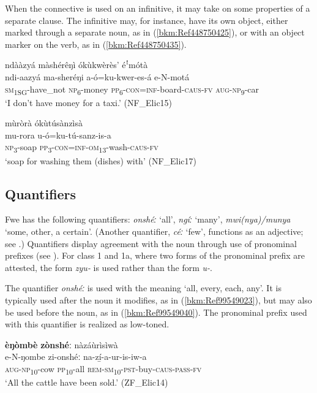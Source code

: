When the connective is used on an infinitive, it may take on some properties of a separate clause. The infinitive may, for instance, have its own object, either marked through a separate noun, as in (\ref{bkm:Ref448750425}), or with an object marker on the verb, as in (\ref{bkm:Ref448750435}).

\ea
\label{bkm:Ref448750425}
ndààzyá màshérêŋì ókùkwèrès’ éꜝmótà\\
\gll ndi-aazyá    ma-sheréŋi a-ó=ku-kwer-es-á      e-N-motá \\
\textsc{sm}\textsubscript{1SG}-have\_not  \textsc{np}\textsubscript{6}-money \textsc{pp}\textsubscript{6}-\textsc{con}=\textsc{inf}-board-\textsc{caus}-\textsc{fv}  \textsc{aug}-\textsc{np}\textsubscript{9}-car\\
\glt ‘I don’t have money for a taxi.’ (NF\_Elic15)
\z

\ea
\label{bkm:Ref448750435}
mùròrà ókùtúsànzìsà\\
\gll mu-rora  u-ó=ku-tú-sanz-is-a\\
\textsc{np}\textsubscript{3}-soap  \textsc{pp}\textsubscript{3}-\textsc{con}=\textsc{inf}-\textsc{om}\textsubscript{13}-wash-\textsc{caus}-\textsc{fv}\\
\glt ‘soap for washing them (dishes) with’ (NF\_Elic17)
\z
\subsection{Quantifiers}\label{bkm:Ref99546522}
\begin{sloppypar}
Fwe has the following quantifiers: \textit{onshéː} ‘all’, \textit{ngíː} ‘many’, \textit{mwi(nya)/munya} ‘some, other, a certain’. (Another quantifier, \textit{céː} ‘few’, functions as an adjective; see .) Quantifiers display agreement with the noun through use of pronominal prefixes (see ). For class 1 and 1a, where two forms of the pronominal prefix are attested, the form \textit{zyu-} is used rather than the form \textit{u-}.
\end{sloppypar}

The quantifier \textit{onshéː} is used with the meaning ‘all, every, each, any’. It is typically used after the noun it modifies, as in (\ref{bkm:Ref99549023}), but may also be used before the noun, as in (\ref{bkm:Ref99549040}). The pronominal prefix used with this quantifier is realized as low-toned.

\ea
\label{bkm:Ref99549023}
\textbf{èŋòmbè} \textbf{zònshéː} nàzáùrìsìwà\\
\gll e-N-ŋombe    zi-onshéː  na-zí̲-a-ur-is-iw-a\\
\textsc{aug}-\textsc{np}\textsubscript{10}-cow  \textsc{pp}\textsubscript{10}-all  \textsc{rem}-\textsc{sm}\textsubscript{10}-\textsc{pst}-buy-\textsc{caus}-\textsc{pass}-\textsc{fv}\\
\glt ‘All the cattle have been sold.’ (ZF\_Elic14)
\z

